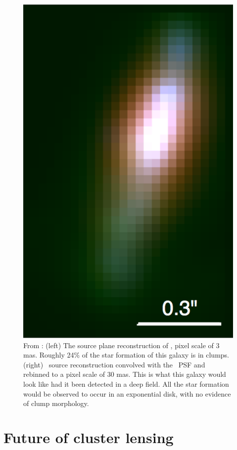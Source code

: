 \begin{figure}
\includegraphics[height=0.4\textheight]{Chap6/candelized_lowres.png}
\caption[Comparison of lensed \giantarc\ source reconstruction to its unlensed deep field realization]{From \citet{Rigby:2017qy}: (left) The source plane reconstruction of \giantarc, pixel scale of 3 mas. Roughly 24\% of the star formation of this galaxy is in clumps. (right) \giantarc\ source reconstruction convolved with the \hst\ PSF and rebinned to a pixel scale of 30 mas. This is what this galaxy would look like had it been detected in a deep field. All the star formation would be observed to occur in an exponential disk, with no evidence of clump morphology.}
\label{chap6:fig:candelized}
\end{figure}

\section{Future of cluster lensing}

